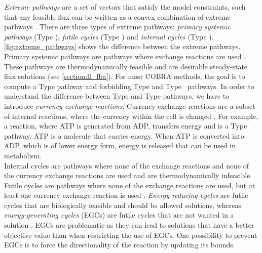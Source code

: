 \textit{Extreme pathways} are a set of vectors that satisfy the model constraints, such that any feasible flux can be written as a convex combination of extreme pathways \cite{price_extreme_2002}.
There are three types of extreme pathways: \textit{primary systemic pathways} (Type ), \textit{futile cycles} (Type ) and \textit{internal cycles} (Type ). \cref{fig:extreme_pathways} shows the difference between the extreme pathways.
Primary systemic pathways are pathways where exchange reactions are used%
 \cite{noor_removing_2018}. These pathways are thermodynamically feasible and are desirable steady-state flux solutions (see \cref{section:ll_fba}). 
For most COBRA methods, the goal is to compute a Type  pathway and forbidding Type  and Type~ pathways.\newpage
In order to understand the difference between Type  and Type  pathways, we have to introduce \textit{currency exchange reactions}. Currency exchange reactions are a subset of internal reactions, where the currency within the cell is changed \cite{noor_removing_2018}. For example, a reaction, where ATP is generated from ADP, transfers energy and is a Type  pathway. ATP is a molecule that carries energy. When ATP is converted into ADP, which is of lower energy form, energy is released that can be used in metabolism. \\
Internal cycles are pathways where none of the exchange reactions and none of the currency exchange reactions are used and are thermodynamically infeasible. 
Futile cycles are pathways where none of the exchange reactions are used, but at least one currency exchange reaction is used \cite{noor_removing_2018}. \textit{Energy-reducing cycles} are futile cycles that are biologically feasible and should be allowed solutions, whereas \textit{energy-generating cycles} (EGCs) are futile cycles that are not wanted in a solution \cite{noor_removing_2018}. EGCs are problematic as they can lead to solutions that have a better objective value than when restricting the use of EGCs. One possibility to prevent EGCs is to force the directionality of the reaction by updating its bounds.

